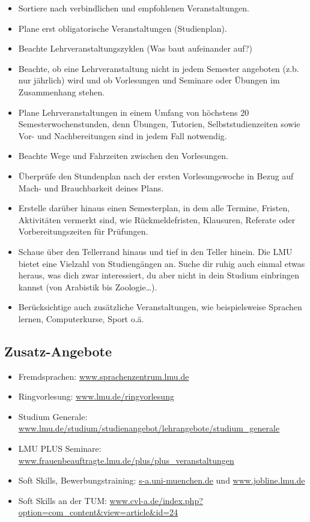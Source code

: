 \documentclass[twoside,12pt,parskip=half-]{scrartcl}
\begin{document}
\begin{itemize}
	\item Sortiere nach verbindlichen und empfohlenen Veranstaltungen.
	\item Plane erst obligatorische Veranstaltungen (Studienplan).
	\item Beachte Lehrveranstaltungszyklen (Was baut aufeinander auf?)
	\item Beachte, ob eine Lehrveranstaltung nicht in jedem
          Semester angeboten (z.b. nur jährlich) wird und ob
          Vorlesungen und Seminare oder Übungen im Zusammenhang
          stehen.
	\item Plane Lehrveranstaltungen in einem Umfang von höchstens 20 Semesterwochenstunden, denn Übungen, Tutorien, Selbststudienzeiten sowie Vor- und Nachbereitungen sind in jedem Fall notwendig.
	\item Beachte Wege und Fahrzeiten zwischen den Vorlesungen.
	\item Überprüfe den Stundenplan nach der ersten Vorlesungswoche in Bezug auf Mach- und Brauchbarkeit deines Plans.
	\item Erstelle darüber hinaus einen Semesterplan, in dem alle Termine, Fristen, Aktivitäten vermerkt sind, wie Rückmeldefristen, Klausuren, Referate oder Vorbereitungszeiten für Prüfungen.
	\item Schaue über den Tellerrand hinaus und tief in den Teller hinein. Die LMU bietet eine Vielzahl von Studiengängen an. Suche dir ruhig auch einmal etwas heraus, was dich zwar interessiert, du aber nicht in dein Studium einbringen kannst (von Arabistik bis Zoologie\ldots).
	\item Berücksichtige auch zusätzliche Veranstaltungen, wie beispielsweise Sprachen lernen, Computerkurse, Sport o.ä.
\end{itemize}


\subsection{Zusatz-Angebote}
\begin{itemize}
	\item Fremdsprachen: \url{www.sprachenzentrum.lmu.de}
	\item Ringvorlesung: \url{www.lmu.de/ringvorlesung}
	\item Studium Generale: \newline \url{www.lmu.de/studium/studienangebot/lehrangebote/studium_generale}
	\item LMU PLUS Seminare: \url{www.frauenbeauftragte.lmu.de/plus/plus_veranstaltungen}
	\item Soft Skills, Bewerbungstraining: \url{s-a.uni-muenchen.de} und \url{www.jobline.lmu.de}
	\item Soft Skills an der TUM: \newline \url{www.cvl-a.de/index.php?option=com_content&view=article&id=24}
\end{itemize}
\end{document}
